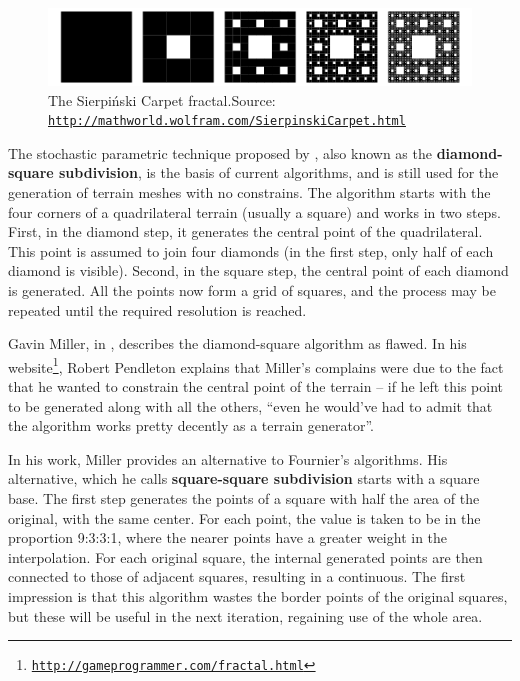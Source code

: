 \documentclass{acmtog}
\begin{document}
\begin{figure}[!htp]
	\begin{center}
		\includegraphics[width=\columnwidth]{images/fractals/carpet.png}
	\end{center}
	\caption{The Sierpiński Carpet fractal.\newline Source: \texttt{\url{http://mathworld.wolfram.com/SierpinskiCarpet.html}}}
	\label{fig:fractal:carpet}
\end{figure}

The stochastic parametric technique proposed by \cite{Fournier82}, also known as the \textbf{diamond-square subdivision}, is the basis of current algorithms, and is still used for the generation of terrain meshes with no constrains. The algorithm starts with the four corners of a quadrilateral terrain (usually a square) and works in two steps. First, in the diamond step, it generates the central point of the quadrilateral. This point is assumed to join four diamonds (in the first step, only half of each diamond is visible). Second, in the square step, the central point of each diamond is generated. All the points now form a grid of squares, and the process may be repeated until the required resolution is reached.

Gavin Miller, in \cite{Miller86}, describes the diamond-square algorithm as flawed. In his website\footnote{\texttt{\url{http://gameprogrammer.com/fractal.html}}}, Robert Pendleton explains that Miller's complains were due to the fact that he wanted to constrain the central point of the terrain -- if he left this point to be generated along with all the others, ``even he would've had to admit that the algorithm works pretty decently as a terrain generator''.

In his work, Miller provides an alternative to Fournier's algorithms. His alternative, which he calls \textbf{square-square subdivision} starts with a square base. The first step generates the points of a square with half the area of the original, with the same center. For each point, the value is taken to be in the proportion 9:3:3:1, where the nearer points have a greater weight in the interpolation. For each original square, the internal generated points are then connected to those of adjacent squares, resulting in a continuous. The first impression is that this algorithm wastes the border points of the original squares, but these will be useful in the next iteration, regaining use of the whole area.
\end{document}
